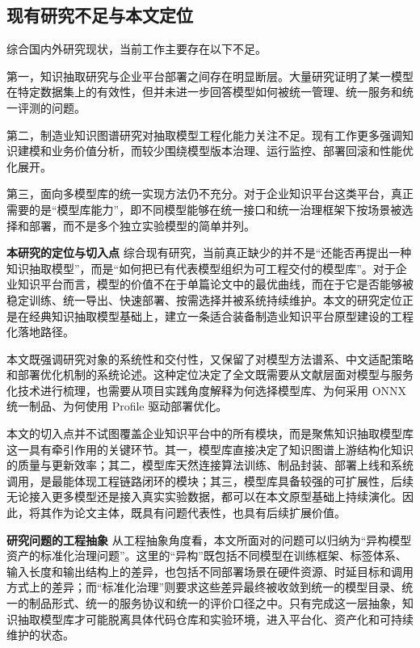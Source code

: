 \subsection{现有研究不足与本文定位}
综合国内外研究现状，当前工作主要存在以下不足。

第一，知识抽取研究与企业平台部署之间存在明显断层。大量研究证明了某一模型在特定数据集上的有效性，但并未进一步回答模型如何被统一管理、统一服务和统一评测的问题。

第二，制造业知识图谱研究对抽取模型工程化能力关注不足。现有工作更多强调知识建模和业务价值分析，而较少围绕模型版本治理、运行监控、部署回滚和性能优化展开。

第三，面向多模型库的统一实现方法仍不充分。对于企业知识平台这类平台，真正需要的是“模型库能力”，即不同模型能够在统一接口和统一治理框架下按场景被选择和部署，而不是多个独立实验模型的简单并列。

\par\textbf{本研究的定位与切入点}
综合现有研究，当前真正缺少的并不是“还能否再提出一种知识抽取模型”，而是“如何把已有代表模型组织为可工程交付的模型库”。对于企业知识平台而言，模型的价值不在于单篇论文中的最优曲线，而在于它是否能够被稳定训练、统一导出、快速部署、按需选择并被系统持续维护。本文的研究定位正是在经典知识抽取模型基础上，建立一条适合装备制造业知识平台原型建设的工程化落地路径。

本文既强调研究对象的系统性和交付性，又保留了对模型方法谱系、中文适配策略和部署优化机制的系统论述。这种定位决定了全文既需要从文献层面对模型与服务化技术进行梳理，也需要从项目实践角度解释为何选择模型库、为何采用 ONNX 统一制品、为何使用 Profile 驱动部署优化。

本文的切入点并不试图覆盖企业知识平台中的所有模块，而是聚焦知识抽取模型库这一具有牵引作用的关键环节。其一，模型库直接决定了知识图谱上游结构化知识的质量与更新效率；其二，模型库天然连接算法训练、制品封装、部署上线和系统调用，是最能体现工程链路闭环的模块；其三，模型库具备较强的可扩展性，后续无论接入更多模型还是接入真实实验数据，都可以在本文原型基础上持续演化。因此，将其作为论文主体，既具有问题代表性，也具有后续扩展价值。

\par\textbf{研究问题的工程抽象}
从工程抽象角度看，本文所面对的问题可以归纳为“异构模型资产的标准化治理问题”。这里的“异构”既包括不同模型在训练框架、标签体系、输入长度和输出结构上的差异，也包括不同部署场景在硬件资源、时延目标和调用方式上的差异；而“标准化治理”则要求这些差异最终被收敛到统一的模型目录、统一的制品形式、统一的服务协议和统一的评价口径之中。只有完成这一层抽象，知识抽取模型库才可能脱离具体代码仓库和实验环境，进入平台化、资产化和可持续维护的状态。

